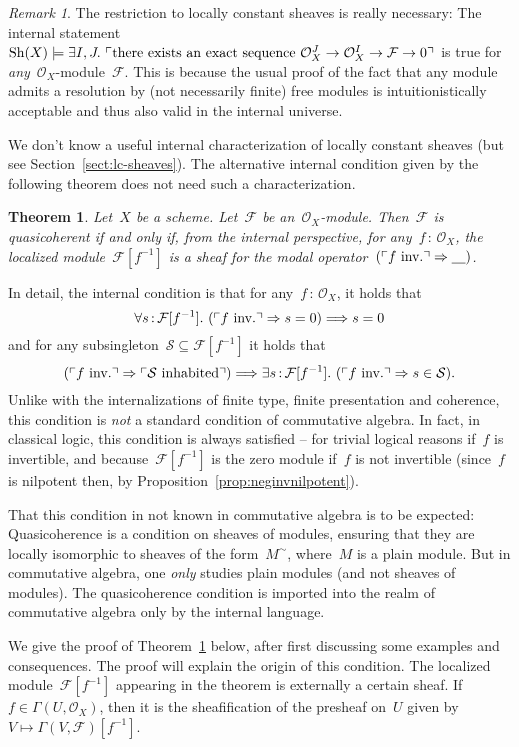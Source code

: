 \documentclass[10pt,reqno,a4paper]{amsbook}
\makeatletter
\theoremstyle{definition}
\theoremstyle{plain}
\newtheorem{thm}[defn]{Theorem}
\theoremstyle{remark}
\newtheorem{rem}[defn]{Remark}
\newcommand{\F}{\mathcal{F}}
\renewcommand{\O}{\mathcal{O}}
\renewcommand{\S}{\mathcal{S}}
\newcommand{\placeholder}{\underline{\quad}}
\newcommand{\Sh}{\mathrm{Sh}}
\newcommand{\?}{\,{:}\,}
\renewcommand{\_}{\mathpunct{.}\,}
\newcommand{\speak}[1]{\ulcorner\text{\textnormal{#1}}\urcorner}
\newcommand{\inv}{inv.\@}
\makeatother
\begin{document}
\begin{rem}The restriction to locally constant sheaves is really necessary: The
internal statement~$\Sh(X) \models \exists I,J\_ \speak{there exists an
exact sequence~$\O_X^J \to \O_X^I \to \F \to 0$}$ is true for
\emph{any}~$\O_X$-module~$\F$. This is because the usual proof of the fact that
any module admits a resolution by (not necessarily finite) free modules is
intuitionistically acceptable and thus also valid in the internal
universe.\end{rem}

We don't know a useful internal characterization of
locally constant sheaves (but see Section~\ref{sect:lc-sheaves}). The
alternative internal condition given by the following
theorem does not need such a characterization.

\begin{thm}\label{thm:qcoh-sheafchar}
Let~$X$ be a scheme. Let~$\F$ be an~$\O_X$-module. Then~$\F$ is
quasicoherent if and only if, from the internal perspective, for any~$f\?\O_X$,
the localized module~$\F[f^{-1}]$ is a sheaf for the modal operator~$(\speak{$f$ \inv}
\Rightarrow \placeholder)$.
\end{thm}

In detail, the internal condition is that for any~$f\?\O_X$, it holds that
\[ \forall s\?\F[f^{-1}]\_
  (\speak{$f$ \inv} \Rightarrow s = 0) \Longrightarrow s = 0 \]
and for any subsingleton~$\S \subseteq \F[f^{-1}]$ it holds that
\[ (\speak{$f$ \inv} \Rightarrow \speak{$\S$ inhabited}) \Longrightarrow
  \exists s\?\F[f^{-1}]\_
  (\speak{$f$ \inv} \Rightarrow s \in \S). \]
Unlike with the internalizations of finite type, finite presentation and
coherence, this condition is \emph{not} a standard condition of commutative
algebra. In fact, in classical logic, this condition is always satisfied --
for trivial logical reasons if~$f$ is invertible, and because~$\F[f^{-1}]$ is
the zero module if~$f$ is not invertible (since~$f$ is nilpotent then, by
Proposition~\ref{prop:neginvnilpotent}).

That this condition in not known in commutative algebra is to be expected:
Quasicoherence is a condition on sheaves of modules, ensuring
that they are locally isomorphic to sheaves of the form~$M^\sim$,
where~$M$ is a plain module. But in commutative algebra, one \emph{only} studies plain
modules (and not sheaves of modules). The quasicoherence condition is imported
into the realm of commutative algebra only by the internal language.

We give the proof of Theorem~\ref{thm:qcoh-sheafchar} below, after first discussing some examples
and consequences. The proof will explain the origin of this condition.
The localized module~$\F[f^{-1}]$ appearing in the theorem
is externally a certain sheaf. If~$f \in \Gamma(U,\O_X)$, then it is the
sheafification of the presheaf on~$U$ given by~$V \mapsto
\Gamma(V,\F)[f^{-1}]$.
\end{document}
